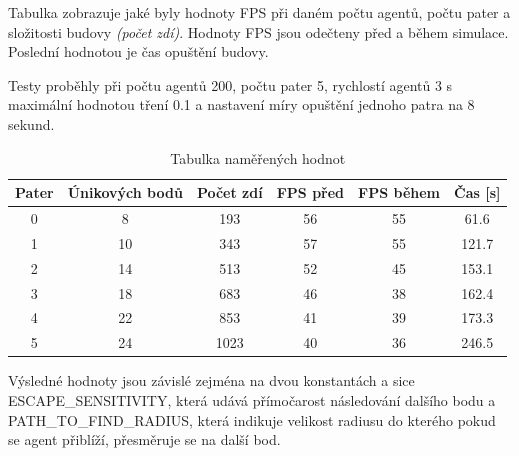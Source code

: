 \documentclass[czech,public,dept460,male,cpdeclaration]{diploma}
\begin{document}
Tabulka zobrazuje jaké byly hodnoty FPS při daném počtu agentů, počtu pater a složitosti budovy \textit{(počet zdí)}. Hodnoty FPS jsou odečteny před a během simulace. Poslední hodnotou je čas opuštění budovy.

Testy proběhly při počtu agentů 200, počtu pater 5, rychlostí agentů 3 s maximální hodnotou tření 0.1 a nastavení míry opuštění jednoho patra na 8 sekund.


\begin{table}[H]
	\centering
	\caption{Tabulka naměřených hodnot}
	\label{tab:tablePC2}
	\renewcommand{\arraystretch}{1.0}
	\begin{tabular}{| c | c | c | c | c | c |}
		\hline
		Pater  & Únikových bodů & Počet zdí & FPS před & FPS během & Čas [s]\\\hline
		0 & 8 & 193 & 56 & 55 & 61.6\\
		1 & 10 & 343 & 57 & 55 & 121.7\\
		2 & 14 & 513 & 52 & 45 & 153.1\\
		3 & 18 & 683 & 46 & 38 & 162.4\\
		4 & 22 & 853 & 41 & 39 & 173.3\\
		5 & 24 & 1023 & 40 & 36 & 246.5\\
		\hline
	\end{tabular}
\end{table}

Výsledné hodnoty jsou závislé zejména na dvou konstantách a sice ESCAPE\_SENSITIVITY, která udává přímočarost následování dalšího bodu a PATH\_TO\_FIND\_RADIUS, která indikuje velikost radiusu do kterého pokud se agent přiblíží, přesměruje se na další bod.
\end{document}
